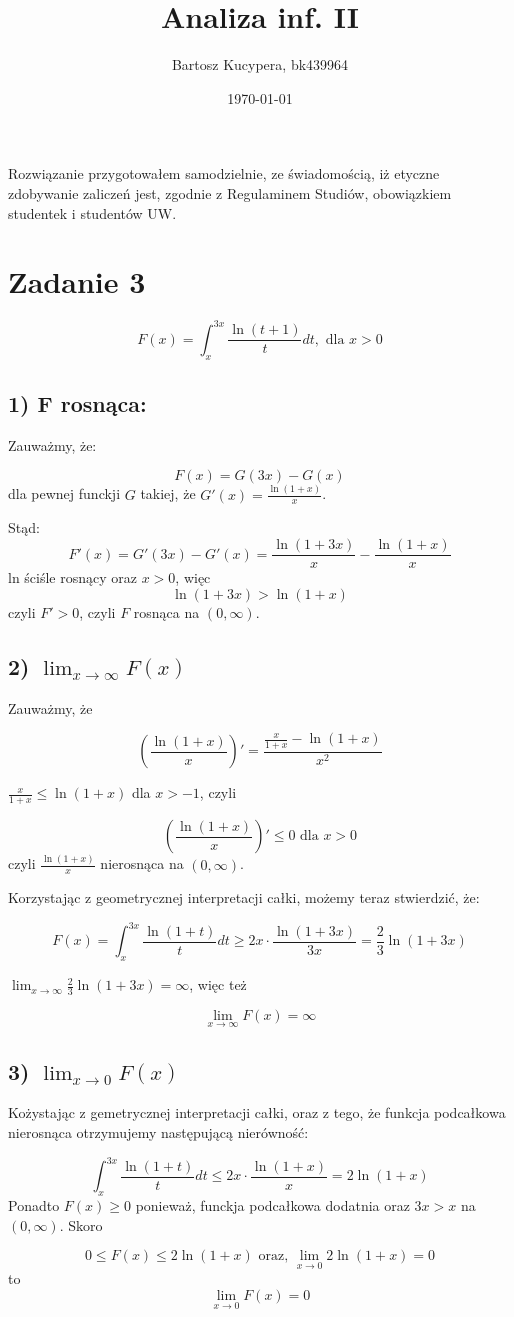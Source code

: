 \documentclass{article}
\title{Analiza inf. II}
\author{Bartosz Kucypera, bk439964}
\date{\today}
\begin{document}
\maketitle

Rozwiązanie przygotowałem samodzielnie, ze świadomością, iż etyczne zdobywanie zaliczeń jest, zgodnie z Regulaminem Studiów, obowiązkiem studentek i studentów UW.

\section*{Zadanie 3} 
$$ F(x) = \int_x^{3x} \frac{\ln(t+1)}{t}dt, \mbox{ dla } x>0 $$

\subsection*{1) F rosnąca:}
Zauważmy, że:

$$ F(x) = G(3x) - G(x) $$
dla pewnej funckji $G$ takiej, że $G'(x)=\frac{\ln(1+x)}{x}$. \newline 

Stąd: 
$$ F'(x) = G'(3x) - G'(x) = \frac{\ln(1+3x)}{x} - \frac{\ln(1+x)}{x} $$
ln ściśle rosnący oraz $x>0$, więc 
$$ \ln(1+3x) > \ln(1+x) $$
czyli $F' > 0$, czyli $F$ rosnąca na $(0,\infty)$.

\subsection*{2) $\displaystyle \lim_{x \to \infty} F(x)$}
Zauważmy, że 

$$ \left( \frac{\ln(1+x)}{x} \right)' = \frac{\frac{x}{1+x} - \ln(1+x)}{x^2}$$

$\frac{x}{1+x} \le \ln(1+x)$ dla $x>-1$, czyli

$$ \left( \frac{\ln(1+x)}{x} \right)' \le 0 \mbox{ dla } x>0$$
czyli $\frac{\ln(1+x)}{x}$ nierosnąca na $(0,\infty)$.

Korzystając z geometrycznej interpretacji całki, możemy teraz stwierdzić, że:

$$ F(x) = \int_x^{3x} \frac{\ln(1+t)}{t}dt \ge 2x \cdot \frac{\ln(1+3x)}{3x} = \frac{2}{3}\ln(1+3x) $$

$\displaystyle \lim_{x \to \infty} \frac{2}{3} \ln(1+3x) = \infty$, więc też 

$$ \lim_{x \to \infty} F(x) = \infty $$

\newpage

\subsection*{3) $\displaystyle \lim_{x \to 0} F(x)$}
Kożystając z gemetrycznej interpretacji całki, oraz z tego, że funkcja podcałkowa nierosnąca otrzymujemy następującą nierówność:

$$ \int_x^{3x} \frac{\ln(1+t)}{t}dt \le 2x \cdot \frac{\ln(1+x)}{x} = 2\ln(1+x) $$
Ponadto $F(x) \ge 0$ ponieważ, funckja podcałkowa dodatnia oraz $3x > x$ na $(0, \infty)$. Skoro 

$$ 0 \le F(x) \le 2\ln(1+x) \mbox{ oraz, } \lim_{x \to 0} 2\ln(1+x) = 0$$
to
$$ \lim_{x \to 0} F(x) = 0 $$
\end{document}
